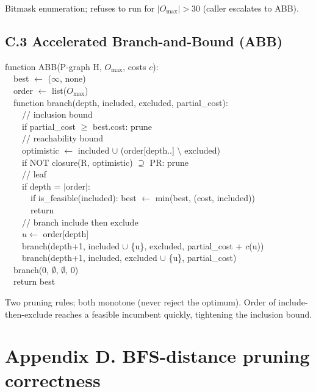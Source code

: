 \documentclass[11pt,a4paper]{article}
\begin{document}
Bitmask enumeration; refuses to run for $|O_{\max}| > 30$ (caller
escalates to ABB).

\subsection*{C.3 Accelerated Branch-and-Bound (ABB)}

\begin{tcolorbox}[colback=soft,colframe=deepblue!60,boxrule=0.2mm,fontupper=\ttfamily\small]
function ABB(P-graph H, $O_{\max}$, costs $c$):\\
~~best $\leftarrow$ ($\infty$, none)\\
~~order $\leftarrow$ list($O_{\max}$)\\
~~function branch(depth, included, excluded, partial\_cost):\\
~~~~// inclusion bound\\
~~~~if partial\_cost $\geq$ best.cost: prune\\
~~~~// reachability bound\\
~~~~optimistic $\leftarrow$ included $\cup$ (order[depth..] $\setminus$ excluded)\\
~~~~if NOT closure(R, optimistic) $\supseteq$ PR: prune\\
~~~~// leaf\\
~~~~if depth = $|$order$|$:\\
~~~~~~if is\_feasible(included): best $\leftarrow$ min(best, (cost, included))\\
~~~~~~return\\
~~~~// branch include then exclude\\
~~~~$u \leftarrow$ order[depth]\\
~~~~branch(depth+1, included $\cup$ \{u\}, excluded, partial\_cost + $c$(u))\\
~~~~branch(depth+1, included, excluded $\cup$ \{u\}, partial\_cost)\\
~~branch(0, $\emptyset$, $\emptyset$, 0)\\
~~return best
\end{tcolorbox}

Two pruning rules; both monotone (never reject the optimum). Order
of include-then-exclude reaches a feasible incumbent quickly,
tightening the inclusion bound.

\section*{Appendix D. BFS-distance pruning correctness}
\end{document}
